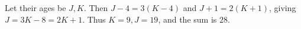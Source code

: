 Let their ages be $J,K$. Then $J-4=3(K-4)$ and $J+1=2(K+1)$, giving $J=3K-8=2K+1$. Thus $K=9,J=19$, and the sum is $\boxed{28}$.
